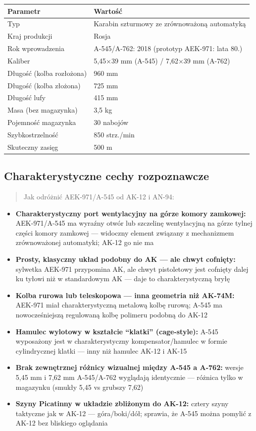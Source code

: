 \documentclass[12pt,oneside]{book}
\providecommand{\tightlist}{%
  \setlength{\itemsep}{0pt}\setlength{\parskip}{0pt}}
\begin{document}
\begin{longtable}[]{@{}ll@{}}
\toprule\noalign{}
Parametr & Wartość \\
\midrule\noalign{}
\endhead
\bottomrule\noalign{}
\endlastfoot
Typ & Karabin szturmowy ze zrównoważoną automatyką \\
Kraj produkcji & Rosja \\
Rok wprowadzenia & A-545/A-762: 2018 (prototyp AEK-971: lata 80.) \\
Kaliber & 5,45×39 mm (A-545) / 7,62×39 mm (A-762) \\
Długość (kolba rozłożona) & 960 mm \\
Długość (kolba złożona) & 725 mm \\
Długość lufy & 415 mm \\
Masa (bez magazynka) & 3,5 kg \\
Pojemność magazynka & 30 nabojów \\
Szybkostrzelność & 850 strz./min \\
Skuteczny zasięg & 500 m \\
\end{longtable}

\subsection{Charakterystyczne cechy
rozpoznawcze}\label{charakterystyczne-cechy-rozpoznawcze-66}

\begin{quote}
Jak odróżnić AEK-971/A-545 od AK-12 i AN-94:
\end{quote}

\begin{itemize}
\tightlist
\item
  \textbf{Charakterystyczny port wentylacyjny na górze komory zamkowej:}
  AEK-971/A-545 ma wyraźny otwór lub szczelinę wentylacyjną na górze
  tylnej części komory zamkowej --- widoczny element związany z
  mechanizmem zrównoważonej automatyki; AK-12 go nie ma
\item
  \textbf{Prosty, klasyczny układ podobny do AK --- ale chwyt cofnięty:}
  sylwetka AEK-971 przypomina AK, ale chwyt pistoletowy jest cofnięty
  dalej ku tyłowi niż w standardowym AK --- daje to charakterystyczną
  bryłę
\item
  \textbf{Kolba rurowa lub teleskopowa --- inna geometria niż AK-74M:}
  AEK-971 miał charakterystyczną metalową kolbę rurową; A-545 ma
  nowocześniejszą regulowaną kolbę polimeru podobną do AK-12
\item
  \textbf{Hamulec wylotowy w kształcie ``klatki'' (cage-style):} A-545
  wyposażony jest w charakterystyczny kompensator/hamulec w formie
  cylindrycznej klatki --- inny niż hamulec AK-12 i AK-15
\item
  \textbf{Brak zewnętrznej różnicy wizualnej między A-545 a A-762:}
  wersje 5,45 mm i 7,62 mm A-545/A-762 wyglądają identycznie --- różnica
  tylko w magazynku (smukły 5,45 vs grubszy 7,62)
\item
  \textbf{Szyny Picatinny w układzie zbliżonym do AK-12:} cztery szyny
  taktyczne jak w AK-12 --- góra/boki/dół; sprawia, że A-545 można
  pomylić z AK-12 bez bliskiego oglądania
\end{itemize}
\end{document}
